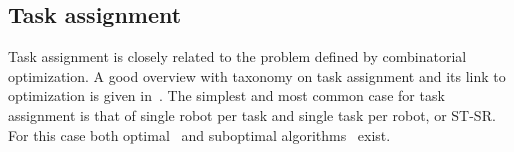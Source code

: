 
\subsection{Task assignment}
Task assignment is closely related to the problem defined by combinatorial optimization.
A good overview with taxonomy on task assignment and its link to optimization is given in~\cite{Gerkey:2004il}. The simplest and most common case for task assignment is that of single robot per task and single task per robot, or ST-SR. For this case both optimal~\cite{kuhn55} and suboptimal algorithms~\cite{Bertsekas:1992wx} exist. 

